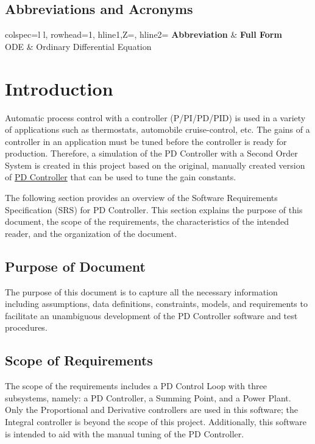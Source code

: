 \documentclass[12pt]{article}
\begin{document}
\subsection{Abbreviations and Acronyms}
\label{Sec:TAbbAcc}
\begin{longtblr}
[caption={Abbreviations and Acronyms}]
{colspec={l l}, rowhead=1, hline{1,Z}=\heavyrulewidth, hline{2}=\lightrulewidth}
\textbf{Abbreviation} & \textbf{Full Form}
\\
ODE & Ordinary Differential Equation
\label{Table:TAbbAcc}
\end{longtblr}
\section{Introduction}
\label{Sec:Intro}
Automatic process control with a controller (P/PI/PD/PID) is used in a variety of applications such as thermostats, automobile cruise-control, etc. The gains of a controller in an application must be tuned before the controller is ready for production. Therefore, a simulation of the PD Controller with a Second Order System is created in this project based on the original, manually created version of \hyperref{https://github.com/muralidn/CAS741-Fall20/tree/master}{}{}{PD Controller} that can be used to tune the gain constants.

The following section provides an overview of the Software Requirements Specification (SRS) for PD Controller. This section explains the purpose of this document, the scope of the requirements, the characteristics of the intended reader, and the organization of the document.

\subsection{Purpose of Document}
\label{Sec:DocPurpose}
The purpose of this document is to capture all the necessary information including assumptions, data definitions, constraints, models, and requirements to facilitate an unambiguous development of the PD Controller software and test procedures.

\subsection{Scope of Requirements}
\label{Sec:ReqsScope}
The scope of the requirements includes a PD Control Loop with three subsystems, namely: a PD Controller, a Summing Point, and a Power Plant. Only the Proportional and Derivative controllers are used in this software; the Integral controller is beyond the scope of this project. Additionally, this software is intended to aid with the manual tuning of the PD Controller.
\end{document}
